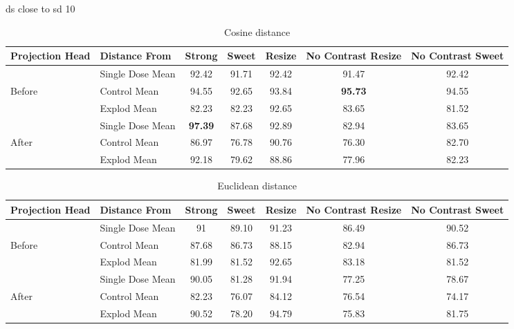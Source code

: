 ds close to sd 10

\begin{table}[H]
  \centering
  \begin{tabular}{@{}llccccc@{}}
  \toprule
  Projection Head & Distance From      & Strong & Sweet & Resize & No Contrast Resize & No Contrast Sweet \\ \midrule
                  & Single Dose Mean   & 92.42      & 91.71     & 92.42      & 91.47                  & 92.42                 \\
  Before          & Control Mean       & 94.55      & 92.65     & 93.84      & \textbf{95.73}                  & 94.55                 \\
                  & Explod Mean        & 82.23      & 82.23     & 92.65     & 83.65                  & 81.52                \\ \midrule
                  & Single Dose Mean   & \textbf{97.39}  & 87.68     & 92.89     & 82.94                  & 83.65                 \\
  After           & Control Mean       & 86.97      & 76.78    & 90.76      & 76.30                 & 82.70                 \\
                  & Explod Mean        & 92.18      & 79.62    & 88.86      & 77.96                  & 82.23                 \\ \bottomrule
  \end{tabular}
  \caption{Cosine distance}
  \label{tab:your_table_label}
\end{table}


\begin{table}[H]
  \centering
  \begin{tabular}{@{}llccccc@{}}
  \toprule
  Projection Head & Distance From      & Strong & Sweet & Resize & No Contrast Resize & No Contrast Sweet \\ \midrule
                  & Single Dose Mean   & 91      & 89.10     & 91.23      & 86.49                  & 90.52                 \\
  Before          & Control Mean       & 87.68      & 86.73     & 88.15      & 82.94                  & 86.73                 \\
                  & Explod Mean        & 81.99      & 81.52     & 92.65      & 83.18                  &   81.52               \\ \midrule
                  & Single Dose Mean   & 90.05      & 81.28     & 91.94      & 77.25                  & 78.67                 \\
  After           & Control Mean       & 82.23      & 76.07     & 84.12      & 76.54                  & 74.17                 \\
                  & Explod Mean        & 90.52      & 78.20    & 94.79      & 75.83                  & 81.75                 \\ \bottomrule
  \end{tabular}
  \caption{Euclidean distance}
  \label{tab:your_table}
\end{table}


